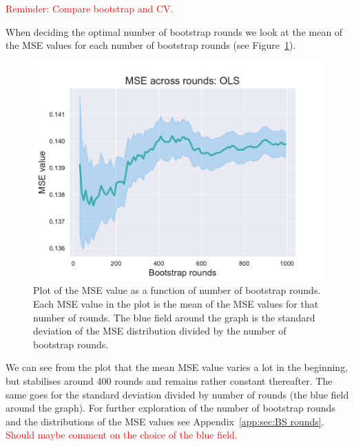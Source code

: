 \documentclass[twocolumn,english,notitlepage]{article}
\newcommand{\comment}[1]{\textcolor{red}{#1}}
\begin{document}
            \comment{Reminder: Compare bootstrap and CV.}

        

            When deciding the optimal number of bootstrap rounds we look at the mean of the MSE values for each number of bootstrap rounds (see Figure~\ref{res:fig:mse across rounds}). 
            \begin{figure}[ht]
                \centering
                \includegraphics[width=\linewidth]{BS_mse_across_rounds_OLS.pdf}
                \caption{Plot of the MSE value as a function of number of bootstrap rounds. Each MSE value in the plot is the mean of the MSE values for that number of rounds. The blue field around the graph is the standard deviation of the MSE distribution divided by the number of bootstrap rounds.}
                \label{res:fig:mse across rounds}
            \end{figure}
            We can see from the plot that the mean MSE value varies a lot in the beginning, but stabilises around 400 rounds and remains rather constant thereafter. The same goes for the standard deviation divided by number of rounds (the blue field around the graph). For further exploration of the number of bootstrap rounds and the distributions of the MSE values see Appendix~\ref{app:sec:BS rounds}. 
            \comment{Should maybe comment on the choice of the blue field.}
\end{document}
